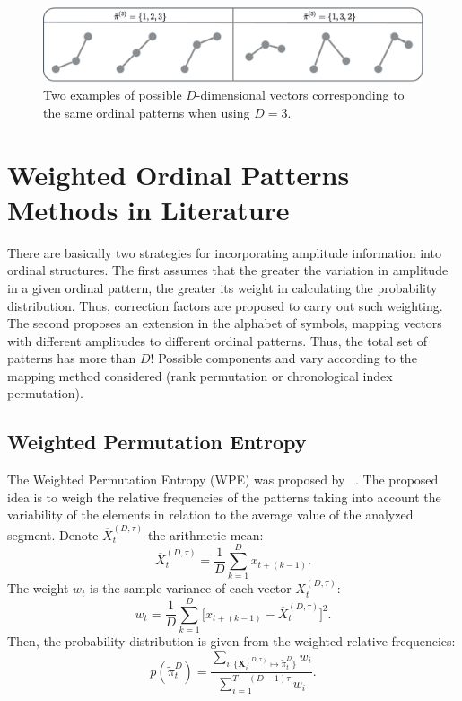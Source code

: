 \begin{figure}
	\centering
	\includegraphics[width=\textwidth]{Figures/possible-patterns.pdf}
	\caption{Two examples of possible $D$-dimensional vectors corresponding to the same ordinal patterns when using $D = 3$.}
	\label{fig:possible-patterns}
\end{figure}

\section{Weighted Ordinal Patterns Methods in Literature}\label{Methods}

There are basically two strategies for incorporating amplitude information into ordinal structures.
The first assumes that the greater the variation in amplitude in a given ordinal pattern, the greater its weight in calculating the probability distribution.
Thus, correction factors are proposed to carry out such weighting.
The second proposes an extension in the alphabet of symbols, mapping vectors with different amplitudes to different ordinal patterns.
Thus, the total set of patterns has more than $D!$ Possible components and vary according to the mapping method considered (rank permutation or chronological index permutation).

\subsection{Weighted Permutation Entropy}\label{WPE}

The Weighted Permutation Entropy (WPE) was proposed by ~\cite{Fadlallah2013Weightedpermutation}. 
The proposed idea is to weigh the relative frequencies of the patterns taking into account the variability of the elements in relation to the average value of the analyzed segment.
Denote $\overline{X}_t^{(D, \tau)}$ the arithmetic mean:
\begin{equation}
\overline{X}_t^{(D, \tau)} = \frac{1}{D} \sum_{k = 1}^{D} x_{t + (k - 1)}.
\end{equation}
The weight $w_{t}$ is the sample variance of each vector $X_t^{(D, \tau)}$:
\begin{equation}
w_{t} = \frac{1}{D} \sum_{k = 1}^{D}\big[x_{t + (k - 1)} - \overline{X}_t^{(D, \tau)}\big]^2 .
\end{equation}
Then, the probability distribution is given from the weighted relative frequencies:
\begin{equation}
p(\widetilde \pi_t^D) = \frac{\sum_{i : \{\mathbf{X}^{(D,\tau)}_i \mapsto \widetilde\pi^D_t\}} w_{i}}{\sum_{i = 1}^{T-(D-1)\tau} w_{i}}.
\end{equation}

